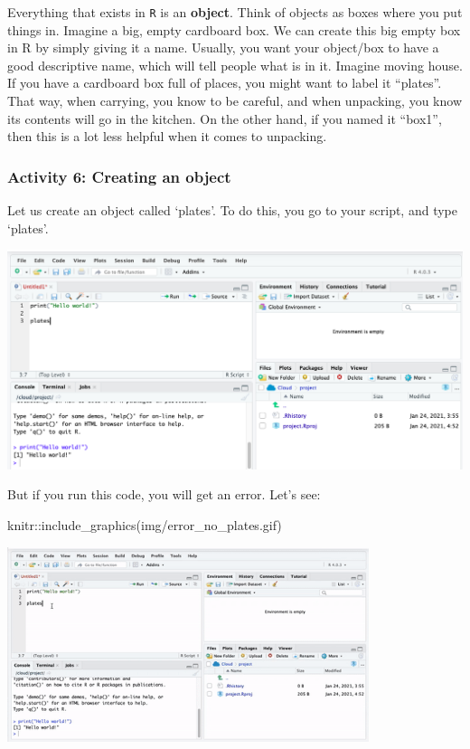 \documentclass[
]{book}
\newenvironment{Shaded}{\begin{snugshade}}{\end{snugshade}}
\newcommand{\FunctionTok}[1]{\textcolor[rgb]{0.00,0.00,0.00}{#1}}
\newcommand{\NormalTok}[1]{#1}
\newcommand{\SpecialCharTok}[1]{\textcolor[rgb]{0.00,0.00,0.00}{#1}}
\newcommand{\StringTok}[1]{\textcolor[rgb]{0.31,0.60,0.02}{#1}}
\begin{document}
Everything that exists in \texttt{R} is an \textbf{object}. Think of objects as boxes where you put things in. Imagine a big, empty cardboard box. We can create this big empty box in R by simply giving it a name. Usually, you want your object/box to have a good descriptive name, which will tell people what is in it. Imagine moving house. If you have a cardboard box full of places, you might want to label it ``plates''. That way, when carrying, you know to be careful, and when unpacking, you know its contents will go in the kitchen. On the other hand, if you named it ``box1'', then this is a lot less helpful when it comes to unpacking.

\hypertarget{activity-6-creating-an-object}{%
\subsubsection{Activity 6: Creating an object}\label{activity-6-creating-an-object}}

Let us create an object called `plates'. To do this, you go to your script, and type `plates'.

\includegraphics{img/plates.png}

But if you run this code, you will get an error. Let's see:

\begin{Shaded}
\begin{Highlighting}[]
\NormalTok{knitr}\SpecialCharTok{::}\FunctionTok{include\_graphics}\NormalTok{(}\StringTok{\textquotesingle{}img/error\_no\_plates.gif\textquotesingle{}}\NormalTok{)}
\end{Highlighting}
\end{Shaded}

\includegraphics[width=400px]{img/error_no_plates}
\end{document}
